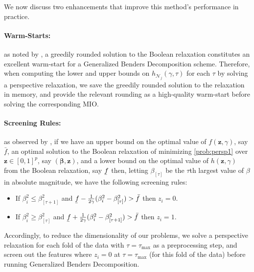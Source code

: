 \documentclass[mnsc,nonblindrev]{informs3} %
\begin{document}
We now discuss two enhancements that improve this method's performance in practice.

\paragraph{Warm-Starts:} as noted by \cite{ bertsimas2021unified}, a greedily rounded solution to the Boolean relaxation constitutes an excellent warm-start for a Generalized Benders Decomposition scheme. Therefore, when computing the lower and upper bounds on $h_{\mathcal{N}_j}(\gamma, \tau)$ for each $\tau$ by solving a perspective relaxation, we save the greedily rounded solution to the relaxation in memory, and provide the relevant rounding as a high-quality warm-start before solving the corresponding MIO. 

\paragraph{Screening Rules:} as observed by \cite{atamturk2020safe}, if we have an upper bound on the optimal value of $f(\bm{z}, \gamma)$, say $\bar{f}$, 
an optimal solution to the Boolean relaxation of minimizing \eqref{prob:persp1} over $\bm{z} \in [0, 1]^p$, say $(\bm{\beta}, \bm{z})$, and a lower bound on the optimal value of $h(\bm{z}, \gamma)$ from the Boolean relaxation, say $\underaccent{\bar}{f}$
then, letting $\beta_{[\tau]}$ be the $\tau$th largest value of $\beta$ in absolute magnitude, we have the following screening rules:
    \begin{itemize}
        \item If $\beta_i^2 \leq \beta_{[\tau+1]}^2$ and $\underaccent{\bar}{f}-\frac{1}{2\gamma}(\beta^2_{i}-\beta^2_{[\tau]})>\bar{f}$ then $z_i=0$.
        \item If $\beta_i^2 \geq \beta_{[\tau]}^2$ and $\underaccent{\bar}{f}+\frac{1}{2\gamma}(\beta_{i}^2-\beta^2_{[\tau+1]})>\bar{f}$ then $z_i=1$.
    \end{itemize}
Accordingly, to reduce the dimensionality of our problems, we solve a perspective relaxation for each fold of the data with $\tau=\tau_{\max}$ as a preprocessing step, and screen out the features where $z_i=0$ at $\tau=\tau_{\max}$ (for this fold of the data) before running Generalized Benders Decomposition.
\end{document}
